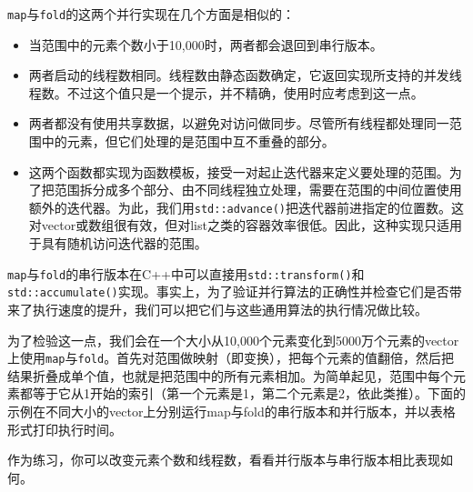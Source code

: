 \texttt{map}与\texttt{fold}的这两个并行实现在几个方面是相似的：



\begin{itemize}
\item 当范围中的元素个数小于10,000时，两者都会退回到串行版本。



\item 两者启动的线程数相同。线程数由静态函数确定，它返回实现所支持的并发线程数。不过这个值只是一个提示，并不精确，使用时应考虑到这一点。



\item 两者都没有使用共享数据，以避免对访问做同步。尽管所有线程都处理同一范围中的元素，但它们处理的是范围中互不重叠的部分。



\item 这两个函数都实现为函数模板，接受一对起止迭代器来定义要处理的范围。为了把范围拆分成多个部分、由不同线程独立处理，需要在范围的中间位置使用额外的迭代器。为此，我们用\texttt{std::\allowbreak{}advance()}把迭代器前进指定的位置数。这对vector或数组很有效，但对list之类的容器效率很低。因此，这种实现只适用于具有随机访问迭代器的范围。

\end{itemize}



\texttt{map}与\texttt{fold}的串行版本在C++中可以直接用\texttt{std::\allowbreak{}transform()}和\texttt{std::\allowbreak{}accumulate()}实现。事实上，为了验证并行算法的正确性并检查它们是否带来了执行速度的提升，我们可以把它们与这些通用算法的执行情况做比较。



为了检验这一点，我们会在一个大小从10,000个元素变化到5000万个元素的vector上使用\texttt{map}与\texttt{fold}。首先对范围做映射（即变换），把每个元素的值翻倍，然后把结果折叠成单个值，也就是把范围中的所有元素相加。为简单起见，范围中每个元素都等于它从1开始的索引（第一个元素是1，第二个元素是2，依此类推）。下面的示例在不同大小的vector上分别运行map与fold的串行版本和并行版本，并以表格形式打印执行时间。



\begin{myNote}
作为练习，你可以改变元素个数和线程数，看看并行版本与串行版本相比表现如何。
\end{myNote}


